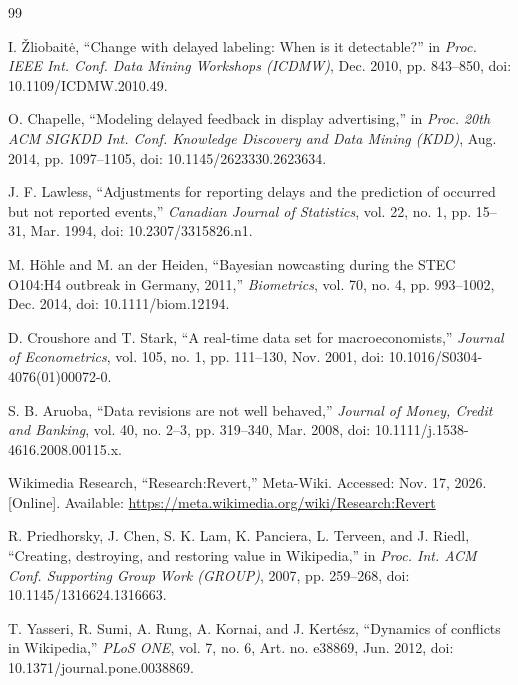 \begin{thebibliography}{99}

I. \v{Z}liobait\.{e}, ``Change with delayed labeling: When is it detectable?'' in \emph{Proc. IEEE Int. Conf. Data Mining Workshops (ICDMW)}, Dec. 2010, pp. 843--850, doi: 10.1109/ICDMW.2010.49.

O. Chapelle, ``Modeling delayed feedback in display advertising,'' in \emph{Proc. 20th ACM SIGKDD Int. Conf. Knowledge Discovery and Data Mining (KDD)}, Aug. 2014, pp. 1097--1105, doi: 10.1145/2623330.2623634.

J. F. Lawless, ``Adjustments for reporting delays and the prediction of occurred but not reported events,'' \emph{Canadian Journal of Statistics}, vol. 22, no. 1, pp. 15--31, Mar. 1994, doi: 10.2307/3315826.n1.

M. H\"ohle and M. an der Heiden, ``Bayesian nowcasting during the STEC O104:H4 outbreak in Germany, 2011,'' \emph{Biometrics}, vol. 70, no. 4, pp. 993--1002, Dec. 2014, doi: 10.1111/biom.12194.

D. Croushore and T. Stark, ``A real-time data set for macroeconomists,'' \emph{Journal of Econometrics}, vol. 105, no. 1, pp. 111--130, Nov. 2001, doi: 10.1016/S0304-4076(01)00072-0.

S. B. Aruoba, ``Data revisions are not well behaved,'' \emph{Journal of Money, Credit and Banking}, vol. 40, no. 2--3, pp. 319--340, Mar. 2008, doi: 10.1111/j.1538-4616.2008.00115.x.

Wikimedia Research, ``Research:Revert,'' Meta-Wiki. Accessed: Nov. 17, 2026. [Online]. Available: \url{https://meta.wikimedia.org/wiki/Research:Revert}

R. Priedhorsky, J. Chen, S. K. Lam, K. Panciera, L. Terveen, and J. Riedl, ``Creating, destroying, and restoring value in Wikipedia,'' in \emph{Proc. Int. ACM Conf. Supporting Group Work (GROUP)}, 2007, pp. 259--268, doi: 10.1145/1316624.1316663.

T. Yasseri, R. Sumi, A. Rung, A. Kornai, and J. Kert\'esz, ``Dynamics of conflicts in Wikipedia,'' \emph{PLoS ONE}, vol. 7, no. 6, Art. no. e38869, Jun. 2012, doi: 10.1371/journal.pone.0038869.


\end{thebibliography}
